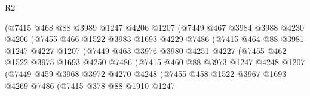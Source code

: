 \begin{lexlean}{R2}
\begin{coremodule}
                        (@7415
                          @468
                          @88
                          @3989
                          @1247
                          @4206
                          @1207
                          (@7449
                            @467
                            @3984
                            @3988
                            @4230
                            @4206
                            (@7455
                              @466
                              @1522
                              @3983
                              @1693
                              @4229
                              @7486
                              (@7415
                                @464
                                @88
                                @3981
                                @1247
                                @4227
                                @1207
                                (@7449
                                  @463
                                  @3976
                                  @3980
                                  @4251
                                  @4227
                                  (@7455
                                    @462
                                    @1522
                                    @3975
                                    @1693
                                    @4250
                                    @7486
                                    (@7415
                                      @460
                                      @88
                                      @3973
                                      @1247
                                      @4248
                                      @1207
                                      (@7449
                                        @459
                                        @3968
                                        @3972
                                        @4270
                                        @4248
                                        (@7455
                                          @458
                                          @1522
                                          @3967
                                          @1693
                                          @4269
                                          @7486
                                          (@7415
                                            @378
                                            @88
                                            @1910
                                            @1247

\end{coremodule}
\end{lexlean}
